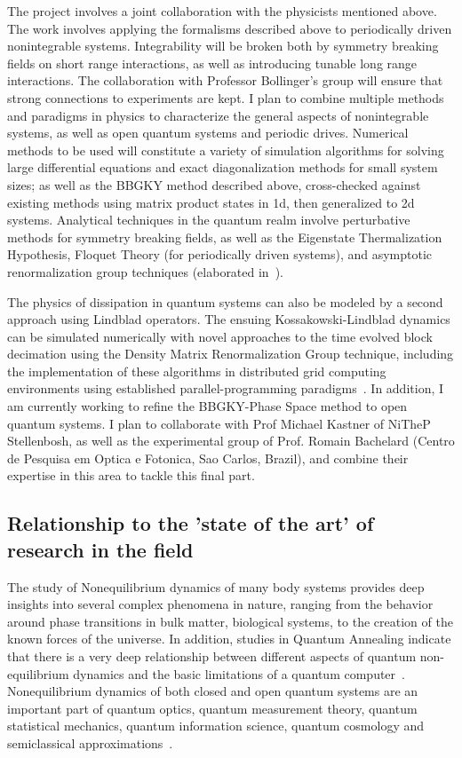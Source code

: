 \documentclass[a4paper,11pt,color]{article}
\begin{document}
The project involves a joint collaboration with the physicists mentioned above. The work involves applying the formalisms described above to periodically driven nonintegrable systems. Integrability will be broken both by symmetry breaking fields on short range interactions, as well as introducing tunable long range interactions. The collaboration with Professor Bollinger's group will ensure that strong connections to experiments are kept. I plan to combine  multiple methods and paradigms in physics to characterize the general aspects of nonintegrable systems, as well as open quantum systems and periodic drives. Numerical methods to be used will constitute a variety of simulation algorithms for solving  large differential equations and exact diagonalization methods for small system sizes; as well as the BBGKY method described above, cross-checked against existing methods using matrix product states in 1d, then generalized to 2d systems. Analytical techniques in the quantum realm involve perturbative methods for symmetry breaking fields, as well as the Eigenstate Thermalization Hypothesis, Floquet Theory (for periodically driven systems), and asymptotic renormalization group techniques (elaborated in~\cite{freezing}).

The physics of dissipation in quantum systems can also be modeled by a second approach using Lindblad operators. The ensuing Kossakowski-Lindblad dynamics  can be simulated numerically with novel approaches to the time evolved block decimation using the Density Matrix Renormalization Group technique, including the implementation of these algorithms in distributed grid computing environments using established parallel-programming paradigms~\cite{white:pdmrg}. In addition, I am currently working to refine the BBGKY-Phase Space method to open quantum systems. I plan to collaborate with Prof Michael Kastner of NiTheP Stellenbosh, as well as the experimental group of Prof. Romain Bachelard (Centro de Pesquisa em Optica e Fotonica, Sao Carlos, Brazil), and combine their expertise in this area to tackle this final part.

\subsection{Relationship to the 'state of the art' of research in the field}
\label{sec:originality}
The study of Nonequilibrium dynamics of many body systems provides deep insights into several complex phenomena in nature, ranging from the behavior around phase transitions in bulk matter, biological systems,  to the creation of the known forces of the universe. In addition, studies in Quantum Annealing indicate that there is a very deep relationship between different aspects of quantum non-equilibrium dynamics and the basic limitations of a quantum computer~\cite{annealing}. Nonequilibrium dynamics of both closed and open quantum systems are an important part of quantum optics, quantum measurement theory, quantum statistical mechanics, quantum information science, quantum cosmology and semiclassical approximations~\cite{openq}. 
\end{document}
